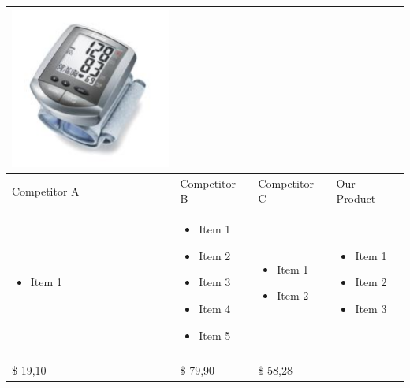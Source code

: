 \documentclass[11pt,titlepage]{article}
\begin{document}
\begin{tabular}{| m{92 pt} | m{92 pt} | m{92 pt} | m{92 pt} |}
  \includegraphics[scale=0.40,bb=0 0 150 150]{prod_bpm4.jpg} \\ \hline
  Competitor A & Competitor B & Competitor C & Our Product\\ \hline
  \begin{itemize} \tiny \item Item 1 \end{itemize} & 
  \begin{itemize} \tiny 
  \item Item 1
  \item Item 2
  \item Item 3
  \item Item 4
  \item Item 5\end{itemize} & 
    \begin{itemize} \tiny 
    \item Item 1
    \item Item 2\end{itemize}& 
      \begin{itemize} \tiny 
      \item Item 1
      \item Item 2
      \item Item 3 \end{itemize} \\
      & & & \\ \hline
      \$ 19,10 & \$ 79,90 & \$ 58,28 & \\ \hline
\end{tabular}
\end{document}
